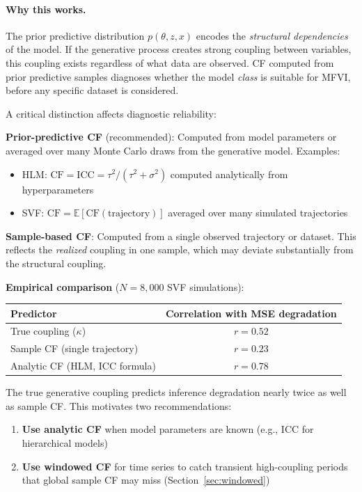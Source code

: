 \documentclass[10pt]{article} %
\theoremstyle{plain}
\theoremstyle{definition}
\begin{document}
\paragraph{Why this works.} The prior predictive distribution $p(\theta, z, x)$ encodes the \emph{structural dependencies} of the model. If the generative process creates strong coupling between variables, this coupling exists regardless of what data are observed. CF computed from prior predictive samples diagnoses whether the model \emph{class} is suitable for MFVI, before any specific dataset is considered.

\begin{tcolorbox}[breakable, colback=green!5, colframe=green!50!black, title=\textbf{Prior-Predictive CF vs.\ Sample-Based CF}, fonttitle=\bfseries]
A critical distinction affects diagnostic reliability:

\textbf{Prior-predictive CF} (recommended): Computed from model parameters or averaged over many Monte Carlo draws from the generative model. Examples:
\begin{itemize}
    \item HLM: $\text{CF} = \text{ICC} = \tau^2 / (\tau^2 + \sigma^2)$ computed analytically from hyperparameters
    \item SVF: $\text{CF} = \mathbb{E}[\text{CF}(\text{trajectory})]$ averaged over many simulated trajectories
\end{itemize}

\textbf{Sample-based CF}: Computed from a single observed trajectory or dataset. This reflects the \emph{realized} coupling in one sample, which may deviate substantially from the structural coupling.

\textbf{Empirical comparison} ($N = 8{,}000$ SVF simulations):
\begin{center}
\begin{tabular}{lc}
\toprule
Predictor & Correlation with MSE degradation \\
\midrule
True coupling ($\kappa$) & $r = 0.52$ \\
Sample CF (single trajectory) & $r = 0.23$ \\
Analytic CF (HLM, ICC formula) & $r = 0.78$ \\
\bottomrule
\end{tabular}
\end{center}

The true generative coupling predicts inference degradation nearly twice as well as sample CF. This motivates two recommendations:
\begin{enumerate}
    \item \textbf{Use analytic CF} when model parameters are known (e.g., ICC for hierarchical models)
    \item \textbf{Use windowed CF} for time series to catch transient high-coupling periods that global sample CF may miss (Section~\ref{sec:windowed})
\end{enumerate}
\end{tcolorbox}
\end{document}
